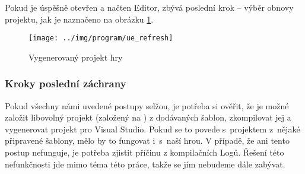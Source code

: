 Pokud je úspěšně otevřen a načten Editor, zbývá poslední krok -- výběr obnovy projektu, jak je naznačeno na obrázku \ref{fig:ue_refresh}.

\begin{figure}[!ht]\centering
\texttt{[image: ../img/program/ue\_refresh]}

\caption{Vygenerovaný projekt hry}
\label{fig:ue_refresh}

\end{figure}

\FloatBarrier


\subsubsection{Kroky poslední záchrany}
Pokud všechny námi uvedené postupy selžou, je potřeba si ověřit, že je možné založit libovolný projekt (založený na \CPP{}) z dodávaných šablon, zkompilovat jej a vygenerovat projekt pro Visual Studio. Pokud se to povede s~projektem z~nějaké připravené šablony, mělo by to fungovat i~s~naší hrou. V případě, že ani tento postup nefunguje, je potřeba zjistit příčinu z kompilačních Logů. Řešení této nefunkčnosti jde mimo téma této práce, takže se jím nebudeme dále zabývat.





